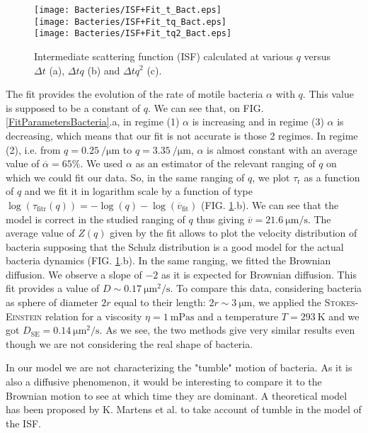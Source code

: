\documentclass[%
 aip,
 jmp,%
 amsmath,amssymb,
reprint,%
]{revtex4-1}
\begin{document}
\begin{figure}
	\texttt{[image: Bacteries/ISF+Fit\_t\_Bact.eps]}\\
	\texttt{[image: Bacteries/ISF+Fit\_tq\_Bact.eps]}\\
	\texttt{[image: Bacteries/ISF+Fit\_tq2\_Bact.eps]}
	\caption{Intermediate scattering function (ISF) calculated at various $q$ versus $\Delta t$ (a), $\Delta tq$ (b) and $\Delta tq^2$ (c).}
	\label{ISFBacteria}
\end{figure}

The fit provides the evolution of the rate of motile bacteria $\alpha$ with $q$. This value is supposed to be a constant of $q$. We can see that, on FIG. \ref{FitParametersBacteria}.a, in regime (1) $\alpha$ is increasing and in regime (3) $\alpha$ is decreasing, which means that our fit is not accurate is those 2 regimes. In regime (2), i.e. from $q = \SI{0.25}{\per\micro\meter}$ to $q = \SI{3.35}{\per\micro\meter}$, $\alpha$ is almost constant with an average value of $\overline{\alpha} = 65\%$. We used $\alpha$ as an estimator of the relevant ranging of $q$ on which we could fit our data. So, in the same ranging of $q$, we plot $\tau_\text{r}$ as a function of $q$ and we fit it in logarithm scale by a function of type $\log(\tau_\text{fitr}(q)) = -\log(q) - \log(\overline{v}_\text{fit})$ (FIG. \ref{ISFBacteria}.b). We can see that the model is correct in the studied ranging of $q$ thus giving $\overline{v} = \SI{21.6}{\micro\meter\per\second}$. The average value of $Z(q)$ given by the fit allows to plot the velocity distribution of bacteria supposing that the Schulz distribution is a good model for the actual bacteria dynamics (FIG. \ref{ISFBacteria}.b). In the same ranging, we fitted the Brownian diffusion. We observe a slope of $-2$ as it is expected for Brownian diffusion. This fit provides a value of $D \sim \SI{0.17}{\micro\meter\squared\per\second}$. To compare this data, considering bacteria as sphere of diameter $2r$ equal to their length: $2r \sim \SI{3}{\micro\meter}$, we applied the \textsc{Stokes-Einstein} relation for a viscosity $\eta = \SI{1}{\milli\pascal\second}$ and a temperature $T=\SI{293}{\kelvin}$ and we got $D_\text{SE} = \SI{0.14}{\micro\meter\squared\per\second}$. As we see, the two methods give very similar results even though we are not considering the real shape of bacteria.

In our model we are not characterizing the "tumble" motion of bacteria. As it is also a diffusive phenomenon, it would be interesting to compare it to the Brownian motion to see at which time they are dominant. A theoretical model has been proposed by K. Martens et al. \cite{6_martens2012probability} to take account of tumble in the model of the ISF.
\end{document}
